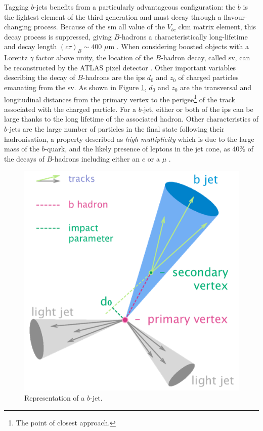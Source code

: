 Tagging $b$-jets benefits from a particularly advantageous configuration: the $b$ is the lightest element of the third generation and must decay through a flavour-changing process. Because of the \gls{sm} all value of the $V_{bc}$ \gls{ckm} matrix element, this decay process is suppressed, giving $B$-hadrons a characteristically long-lifetime and decay length $(c\tau)_{B} \sim 400$  $\mu$m \cite{Tanabashi:2018oca}. When considering boosted objects with a Lorentz $\gamma$ factor above unity, the location of the $B$-hadron decay, called  \gls{sv}, can be reconstructed by the ATLAS pixel detector \cite{Aad:2019aic}. Other important variables describing the decay of $B$-hadrons are the \glspl{ip} $d_0$ and $z_0$ of charged particles emanating from the \gls{sv}. As shown in Figure \ref{fig:bjet}, $d_0$ and $z_0$ are the transversal and longitudinal distances from the primary vertex to the perigee\footnote{The point of closest approach.} of the track associated with the charged particle. For a $b$-jet, either or both of the \glspl{ip} can be large thanks to the long lifetime of the associated hadron. Other characteristics of $b$-jets are the large number of particles in the final state following their hadronisation, a property described as \textit{high multiplicity} which is due to the large mass of the $b$-quark, and the likely presence of leptons in the jet cone, as 40\% of the decays of $B$-hadrons including either an $e$ or a $\mu$ \cite{Tanabashi:2018oca}. \\

\begin{figure}[h!]
\center
\includegraphics[scale=0.6]{Images/bjet}
\caption{Representation of a $b$-jet.} 
\label{fig:bjet}
\end{figure}

